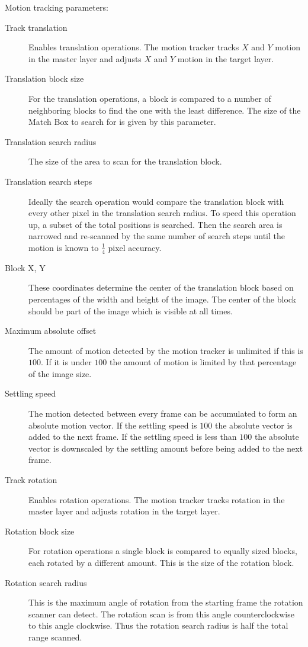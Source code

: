 Motion tracking parameters:

\begin{description}
    \item[Track translation] Enables translation operations. The motion tracker tracks $X$ and $Y$ motion in the master layer and adjusts $X$ and $Y$ motion in the target layer.

    \item[Translation block size] For the translation operations, a block is compared to a number of neighboring blocks to find the one with the least difference. The size of the Match Box to search for is given by this parameter.
    \item[Translation search radius] The size of the area to scan for the translation block.
    \item[Translation search steps] Ideally the search operation would compare the translation block with every other pixel in the translation search radius. To speed this operation up, a subset of the total positions is searched. Then the search area is narrowed and re-scanned by the same number of search steps until the motion is known to $\frac{1}{4}$ pixel accuracy.
    \item[Block X, Y] These coordinates determine the center of the translation block based on percentages of the width and height of the image. The center of the block should be part of the image which is visible at all times.
    \item[Maximum absolute offset] The amount of motion detected by the motion tracker is unlimited if this is $100$. If it is under $100$ the amount of motion is limited by that percentage of the image size.
    \item[Settling speed] The motion detected between every frame can be accumulated to form an absolute motion vector. If the settling speed is $100$ the absolute vector is added to the next frame. If the settling speed is less than $100$ the absolute vector is downscaled by the settling amount before being added to the next frame.
    \item[Track rotation] Enables rotation operations. The motion tracker tracks rotation in the master layer and adjusts rotation in the target layer.
    \item[Rotation block size] For rotation operations a single block is compared to equally sized blocks, each rotated by a different amount. This is the size of the rotation block.
    \item[Rotation search radius] This is the maximum angle of rotation from the starting frame the rotation scanner can detect. The rotation scan is from this angle counterclockwise to this angle clockwise. Thus the rotation search radius is half the total range scanned.

\end{description}
